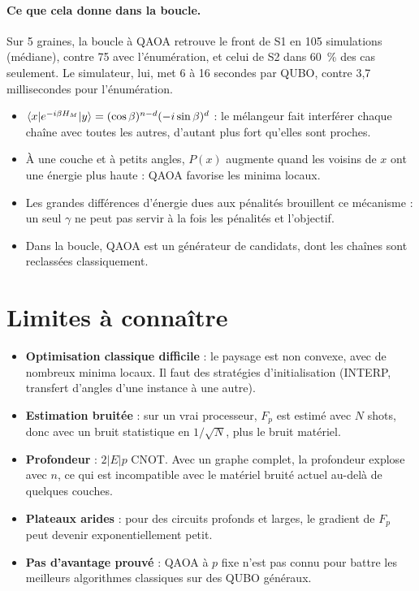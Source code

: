 \paragraph{Ce que cela donne dans la boucle.} Sur 5 graines, la boucle à QAOA retrouve le front de S1 en 105 simulations (médiane), contre 75 avec l'énumération, et celui de S2 dans 60~\% des cas seulement. Le simulateur, lui, met 6 à 16 secondes par QUBO, contre 3,7 millisecondes pour l'énumération.

\begin{resultat}
\begin{itemize}
\item $\langle x\rvert e^{-i\beta H_M}\lvert y\rangle=(\cos\beta)^{n-d}(-i\sin\beta)^d$ : le mélangeur fait interférer chaque chaîne avec toutes les autres, d'autant plus fort qu'elles sont proches.
\item À une couche et à petits angles, $P(x)$ augmente quand les voisins de $x$ ont une énergie plus haute : QAOA favorise les minima locaux.
\item Les grandes différences d'énergie dues aux pénalités brouillent ce mécanisme : un seul $\gamma$ ne peut pas servir à la fois les pénalités et l'objectif.
\item Dans la boucle, QAOA est un générateur de candidats, dont les chaînes sont reclassées classiquement.
\end{itemize}
\end{resultat}

\section{Limites à connaître}
\begin{itemize}
\item \textbf{Optimisation classique difficile} : le paysage est non convexe, avec de nombreux minima locaux. Il faut des stratégies d'initialisation (INTERP, transfert d'angles d'une instance à une autre).
\item \textbf{Estimation bruitée} : sur un vrai processeur, $F_p$ est estimé avec $N$ shots, donc avec un bruit statistique en $1/\sqrt N$, plus le bruit matériel.
\item \textbf{Profondeur} : $2|E|p$ CNOT. Avec un graphe complet, la profondeur explose avec $n$, ce qui est incompatible avec le matériel bruité actuel au-delà de quelques couches.
\item \textbf{Plateaux arides} : pour des circuits profonds et larges, le gradient de $F_p$ peut devenir exponentiellement petit.
\item \textbf{Pas d'avantage prouvé} : QAOA à $p$ fixe n'est pas connu pour battre les meilleurs algorithmes classiques sur des QUBO généraux.
\end{itemize}

